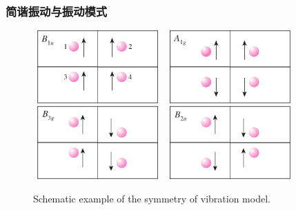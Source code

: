 {\frame
{
	\frametitle{简谐振动与振动模式}
\begin{figure}[h!]
\centering
\vspace*{-0.05in}
\includegraphics[height=1.1in,width=1.95in,viewport=0 0 520 310,clip]{Figures/Viberation_of_B1u.png}
\includegraphics[height=1.1in,width=1.95in,viewport=0 0 515 310,clip]{Figures/Viberation_of_A1g.png}
\vskip 4pt
\includegraphics[height=1.1in,width=1.95in,viewport=0 0 520 310,clip]{Figures/Viberation_of_B3g.png}
\includegraphics[height=1.1in,width=1.95in,viewport=0 0 515 310,clip]{Figures/Viberation_of_B2u.png}
\caption{\tiny \textrm{Schematic example of the symmetry of vibration model.}}%
\label{virbration_model-symmetry}
\end{figure} 
}

}
